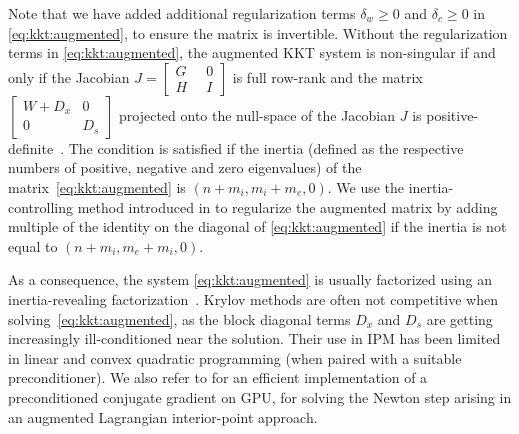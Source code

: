Note that we have added additional regularization terms $\delta_w \geq 0 $
and $\delta_c \geq 0$ in \eqref{eq:kkt:augmented}, to ensure the
matrix is invertible.
Without the regularization terms in \eqref{eq:kkt:augmented}, the augmented KKT system is non-singular
if and only if the Jacobian $J = \begin{bmatrix} G \; &\; 0 \\ H \;&\; I \end{bmatrix}$
is full row-rank and the matrix $\begin{bmatrix} W + D_x & 0 \\ 0 & D_s \end{bmatrix}$
projected onto the null-space of the Jacobian $J$ is positive-definite~\cite{benzi2005numerical}.
The condition is satisfied if the inertia (defined as the respective numbers
of positive, negative and zero eigenvalues) of the matrix~\eqref{eq:kkt:augmented} is $(n + m_i, m_i + m_e, 0)$.
We use the inertia-controlling method introduced in \cite{wachter2006implementation}
to regularize the augmented matrix by adding multiple of the identity
on the diagonal of \eqref{eq:kkt:augmented} if the inertia is not equal to $(n+m_i, m_e+m_i, 0)$.

As a consequence, the system \eqref{eq:kkt:augmented} is usually factorized using
an inertia-revealing \lblt factorization~\cite{duff1983multifrontal}.
Krylov methods are often not competitive when solving~\eqref{eq:kkt:augmented},
as the block diagonal terms $D_x$ and $D_s$ are getting increasingly
ill-conditioned near the solution. Their use in IPM has been limited in
linear and convex quadratic programming \cite{gondzio-2012} (when paired
with a suitable preconditioner). We also refer to \cite{cao2016augmented}
for an efficient implementation of a preconditioned conjugate gradient
on GPU, for solving the Newton step arising in an augmented Lagrangian interior-point
approach.

